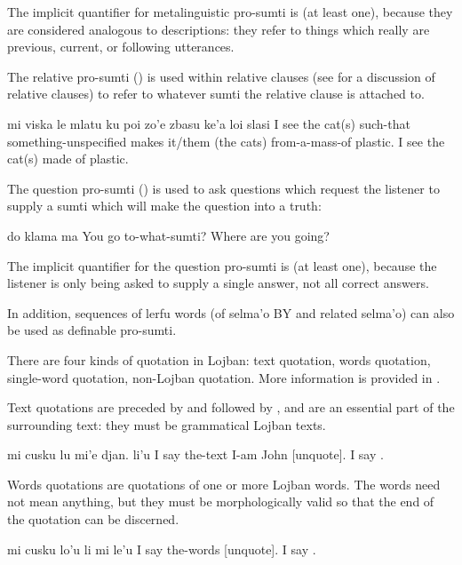 The implicit quantifier for metalinguistic pro-sumti is
     (at least one), because they are considered analogous
    to  descriptions: they refer to things which really are
    previous, current, or following utterances. 

The relative pro-sumti () is used within relative
    clauses (see  for a
    discussion of relative clauses) to refer to whatever sumti the
    relative clause is attached to.
\begin{example}
mi viska le mlatu ku\n
\T	poi zo'e zbasu ke'a\n
\T	loi slasi\n
I see the cat(s)\n
\T	such-that something-unspecified makes it/them (the cats)\n
\T	from-a-mass-of plastic.\n
I see the cat(s) made of plastic.
\end{example}

The question pro-sumti () is used to ask questions which
    request the listener to supply a sumti which will make the
    question into a truth:
\begin{example}
do klama ma\n
You go to-what-sumti?\n
Where are you going?
\end{example}

The implicit quantifier for the question pro-sumti is 
    (at least one), because the listener is only being asked to
    supply a single answer, not all correct answers. 

In addition, sequences of lerfu words (of selma'o BY and
    related selma'o) can also be used as definable pro-sumti.



There are four kinds of quotation in Lojban: text quotation,
    words quotation, single-word quotation, non-Lojban quotation.
    More information is provided in .

Text quotations are preceded by  and followed by
    , and are an essential part of the surrounding text:
    they must be grammatical Lojban texts.
\begin{example}
mi cusku lu mi'e djan. li'u\n
I say the-text  I-am John [unquote].\n
I say .
\end{example}

Words quotations are quotations of one or more Lojban words.
    The words need not mean anything, but they must be
    morphologically valid so that the end of the quotation can be
    discerned.
\begin{example}
mi cusku lo'u li mi le'u\n
I say the-words   [unquote].\n
I say .
\end{example}

